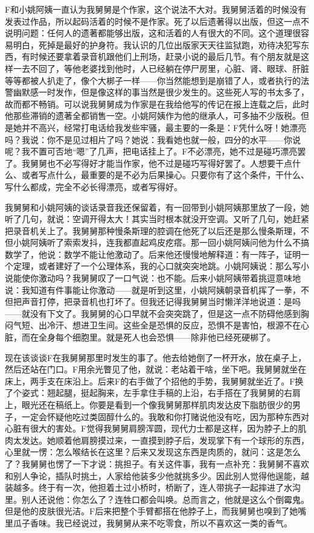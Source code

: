 F和小姚阿姨一直认为我舅舅是个作家，这个说法不大对。我舅舅活着的时候没有发表过作品，所以起码活着的时候不是作家。死了以后遗著得以出版，但这一点不说明问题：任何人的遗著都能够出版，这和活着的人有很大的不同。这个道理很容易明白，死掉是最好的护身符。我认识的几位出版家天天往监狱跑，劝待决犯写东西，有时候还要拿着录音机跟他们上刑场，赶录小说的最后几节。有个朋友就是这样一去不回了，等他老婆找到他时，人已经躺在停尸房里，心脏、肾、眼球、肝脏等等都被人扒走了，像个大梆子一样——你当然能想到是崩错了人，或者执行的法警幽默感一时发作，但是像这样的事当然是很少发生的。这些死人写的书太多了，故而都不畅销。可以说我舅舅成为作家是在我给他写的传记在报上连载之后，此时他那些滞销的遗著全都销售一空。小姚阿姨作为他的继承人，可多抽不少版税。但是她并不高兴，经常打电话给我发些牢骚，最主要的一条是：F凭什么呀！她漂亮吗？我说：你不是见过相片了吗？她说：我看她也就一般，四分的水平——你说呢？我不置可否地“嗯”了几声，把电话挂上了。F不必漂亮，她不过是碰巧漂亮罢了。我舅舅也不必写得好才能当作家，他不过是碰巧写得好罢了。人想要干点什么、或者写点什么，最重要的是不必为后果操心。只要你有了这个条件，干什么、写什么都成，完全不必长得漂亮，或者写得好。 

我舅舅和小姚阿姨的谈话录音我还保留着，有一回带到小姚阿姨那里放了一段，她听了几句，就说：空调开得太大！其实当时根本就没开空调。又听了几句，她赶紧把录音机关上了。我舅舅那种慢条斯理的腔调在他死了以后还是那么慢条斯理，不但小姚阿姨听了索索发抖，连我都直起鸡皮疙瘩。那一回小姚阿姨问他为什么不搞数学了，他说：数学不能让他激动了。后来他还慢慢地解释道：有一阵子，证明一个定理，或者建好了一个公理体系，我的心口就突突地跳。小姚阿姨说：那么写小说能使你激动吗？我舅舅叹了一口气说：也不能。后来小姚阿姨带着挑逗意味地说：我知道有件事能让你激动——就是听到这里，小姚阿姨朝录音机挥了一拳，不但把声音打停，把录音机也打坏了。但我还记得我舅舅当时懒洋洋地说道：是吗——就没有下文了。我舅舅的心口早就不会突突跳了，但是这一点不防碍他感到胸闷气短、出冷汗、想进卫生间。这些全是恐惧的反应，恐惧不是害怕，根源不在心脏，而在全身每个细胞里。就是死人也会恐惧——除非他已经死硬梆了。 

现在该谈谈F在我舅舅那里时发生的事了。他去给她倒了一杯开水，放在桌子上，然后还站在门口。F用余光瞥见了他，就说：老站着干啥，坐下吧。我舅舅就坐在床上，两手支在床沿上。后来F的右手做了个招他的手势，我舅舅就坐近了。F换了个姿式：翘起腿，挺起胸来，左手拿住手稿的上沿，右手搭在了我舅舅的右肩上，眼光还在稿纸上。你要是看到一个像我舅舅那样肌肉发达皮下脂肪很少的男子，一定会怀疑他吃过类固醇什么的。我敢和你打赌说他没有吃，因为那种东西对心脏有很大的害处。F觉得我舅舅肩膀浑圆，现代力士都是这样，因为脖子上的肌肉太发达。她顺着他肩膀摸过来，一直摸到脖子后，发现掌下有一个球形的东西，心里就一愣：怎么喉结长在这里？后来又发现这东西是肉质的，就问：这是怎么了？我舅舅也愣了一下才说：挑担子。有关这件事，我有一点补充：我舅舅不喜欢和别人争论，插队时挑土，人家给他装多少他就挑多少。因此别人觉得他逞能，越装越多。终于有一次，他担着土过小桥时，桥断了，连人带挑子一起摔进了水沟里。别人还说他：你怎么了？连牲口都会叫唤。总而言之，他就是这么个倒霉鬼。但是他的皮肤很光洁。F后来把整个手臂都搭在他脖子上，而我舅舅也嗅到了她嘴里瓜子香味。我已经说过，我舅舅从来不吃零食，所以不喜欢这一类的香气。 

